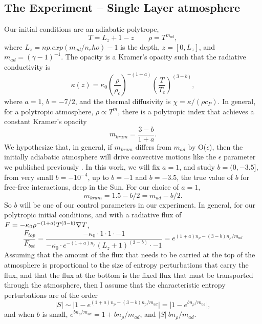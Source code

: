 \subsection{The Experiment -- Single Layer atmosphere}
Our initial conditions are an adiabatic polytrope,
$$
T = L_z + 1 - z \qquad \rho = T^{m_{ad}},
$$
where $L_z = np.exp(m_{ad}/n_rho) - 1$ is the depth, $z = [0, L_z]$, and
$m_{ad} = (\gamma - 1)^{-1}$.
The opacity is a Kramer's opacity \cite{kapyla&all2017} such that the
radiative conductivity is
$$
\kappa(z) = \kappa_0 \left(\frac{\rho}{\rho_c}\right)^{-(1+a)} \left(\frac{T}{T_c}\right)^{(3-b)},
$$
where $a = 1$, $b = -7/2$, and the thermal diffusivity is 
$\chi = \kappa / (\rho c_P)$. In general, for a polytropic
atmosphere, $\rho \propto T^m$, there is a polytropic index
that achieves a constant Kramer's opacity \cite{jones1976}
$$
m_{kram} = \frac{3 - b}{1 + a}.
$$
We hypothesize that, in general, if $m_{kram}$ differs from
$m_{ad}$ by O($\epsilon$), then the initially adiabatic atmosphere will
drive convective motions like the $\epsilon$ parameter we published
previously \cite{anders&brown2017}. In this work, we will fix
$a = 1$, and study $b = (0, -3.5]$, from very small $b = -10^{-4}$,
up to $b = -1$ and $b = -3.5$, the true value of $b$ for free-free
interactions, deep in the Sun. For our choice of $a = 1$,
\begin{equation}
m_{kram} = 1.5 - b/2 = m_{ad} - b/2.
\end{equation}
So $b$ will be one of our control parameters in our experiment. In
general, for our polytropic initial conditions, and with a radiative
flux of $F = -\kappa_0 \rho^{-(1+a)}T^{(3-b)} \nabla T$,
\begin{equation}
\frac{F_{top}}{F_{bot}} = \frac{-\kappa_0\cdot 1 \cdot 1 \cdot -1}
                         {-\kappa_0\cdot e^{-(1+a)n_\rho} (L_z+1)^{(3-b)}\cdot -1}
= e^{(1+a)n_\rho - (3-b)n_\rho / m_{ad}}
\end{equation}
Assuming that the amount of the flux that needs to be carried at the top of
the atmosphere is proportional to the size of entropy perturbations that
carry the flux, and that the flux at the
bottom is the fixed flux that must be transported through the atmosphere, 
then I assume that the characteristic entropy perturbations are of the order
$$
|S| \sim \bigg| 1 - e^{(1+a)n_\rho - (3-b)n_\rho / m_{ad}} \bigg| = \bigg| 1 - e^{b n_\rho / m_{ad}} \bigg|,
$$
and when $b$ is small, $e^{b n_\rho / m_{ad}} = 1 + b n_\rho / m_{ad}$, and
$|S| ~ b n_\rho / m_{ad}$.

